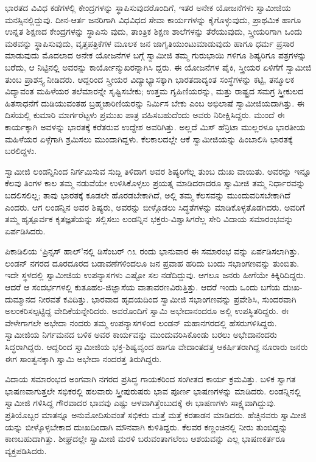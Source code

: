ಭಾರತದ ವಿವಿಧ ಕಡೆಗಳಲ್ಲಿ ಕೇಂದ್ರಗಳನ್ನು ಸ್ಥಾಪಿಸುವುದರೊಂದಿಗೆ, ಇತರ ಅನೇಕ ಯೋಜನೆಗಳು ಸ್ವಾಮೀಜಿಯ ಮನಸ್ಸಿನಲ್ಲಿದ್ದುವು. ದೀನ-ಆರ್ತ ಜನರಿಗಾಗಿ ವಿಧವಿಧದ ಸೇವಾ ಕಾರ್ಯಗಳನ್ನು ಕೈಗೊಳ್ಳುವುದು, ಪ್ರಾಥಮಿಕ ಹಾಗೂ ಉನ್ನತ ಶಿಕ್ಷಣದ ಕೇಂದ್ರಗಳನ್ನು ಸ್ಥಾಪಿಸು ವುದು, ತಾಂತ್ರಿಕ ಶಿಕ್ಷಣ ಶಾಲೆಗಳನ್ನು ತೆರೆಯುವುದು, ಸ್ತ್ರೀಯರಿಗಾಗಿ ಒಂದು ಮಠವನ್ನು ಸ್ಥಾಪಿಸುವುದು, ವೃತ್ತಪತ್ರಿಕೆಗಳ ಮೂಲಕ ಜನ ಜಾಗೃತಿಯುಂಟುಮಾಡುವುದು ಹಾಗೂ ಧರ್ಮ ಪ್ರಸಾರ ಮಾಡುವುದು ಮೊದಲಾದ ಅನೇಕ ಯೋಜನೆಗಳ ಬಗ್ಗೆ ಸ್ವಾಮೀಜಿ ತಮ್ಮ ಗುರುಭಾಯಿ ಗಳಿಗೂ ಶಿಷ್ಯರಿಗೂ ಪತ್ರಗಳನ್ನು ಬರೆದು, ಆ ನಿಟ್ಟಿನಲ್ಲಿ ಅವರನ್ನು ಕಾರ್ಯೋನ್ಮುಖರನ್ನಾಗಿಸಿ ದ್ದರು. ಈ ಯೋಜನೆಗಳ ಪೈಕಿ, ಸ್ತ್ರೀಯರ ಏಳಿಗೆಗೆ ಸ್ವಾಮೀಜಿ ತುಂಬ ಪ್ರಾಶಸ್ತ್ಯ ನೀಡಿದರು. ಆದ್ದರಿಂದ ಸ್ತ್ರೀಯರ ವಿದ್ಯಾಭ್ಯಾಸಕ್ಕಾಗಿ ಭಾರತದಾದ್ಯಂತ ಸಂಸ್ಥೆಗಳನ್ನು ಕಟ್ಟಿ, ತನ್ಮೂಲಕ ವಿದ್ಯಾವಂತ ಮಹಿಳೆಯರ ತಲೆಮಾರನ್ನೇ ಸೃಷ್ಟಿಸಬೇಕು; ಉತ್ತಮ ಗೃಹಿಣಿಯರನ್ನು, ಮತ್ತು ರಾಷ್ಟ್ರದ ಸಮಗ್ರ ಸ್ತ್ರೀಕುಲದ ಹಿತಸಾಧನೆಗೆ ದುಡಿಯುವಂತಹ ಬ್ರಹ್ಮಚಾರಿಣಿಯರನ್ನು ನಿರ್ಮಿಸ ಬೇಕು ಎಂಬ ಅಭಿಲಾಷೆ ಸ್ವಾಮೀಜಿಯದಾಗಿತ್ತು. ಈ ದಿಸೆಯಲ್ಲಿ ಕುಮಾರಿ ಮಾರ್ಗರೆಟ್ಟಳು ಪ್ರಮುಖ ಪಾತ್ರ ವಹಿಸಬಹುದೆಂದು ಅವರು ನಿರೀಕ್ಷಿಸಿದ್ದರು. ಮುಂದೆ ಈ ಕಾರ್ಯಕ್ಕಾಗಿ ಅವಳನ್ನು ಭಾರತಕ್ಕೆ ಕರೆತರುವ ಉದ್ದೇಶ ಅವರಿಗಿತ್ತು. ಅಲ್ಲದೆ ಮಿಸ್ ಹೆನ್ರಿಟಾ ಮುಲ್ಲರಳೂ ಭಾರತೀಯ ಮಹಿಳೆಯರ ಏಳ್ಗೆಗಾಗಿ ಶ್ರಮಿಸಲು ಮುಂದಾಗಿದ್ದಳು. ಕೆಲಕಾಲದಲ್ಲೇ ಆಕೆ ಸ್ವಾಮೀಜಿಯನ್ನು ಹಿಂಬಾಲಿಸಿ ಭಾರತಕ್ಕೆ ಬರಲಿದ್ದಳು.

ಸ್ವಾಮೀಜಿ ಲಂಡನ್ನಿನಿಂದ ನಿರ್ಗಮಿಸುವ ಸುದ್ದಿ ತಿಳಿದಾಗ ಅವರ ಶಿಷ್ಯರಿಗೆಲ್ಲ ತುಂಬ ದುಃಖ ವಾಯಿತು. ಅವರನ್ನು ಇನ್ನೂ ಕೆಲವು ತಿಂಗಳ ಕಾಲ ತಮ್ಮ ನಡುವೆಯೇ ಉಳಿಸಿಕೊಳ್ಳಲು ಪ್ರಯತ್ನ ಮಾಡಿದರಾದರೂ ಸ್ವಾಮೀಜಿ ತಮ್ಮ ನಿರ್ಧಾರವನ್ನು ಬದಲಿಸಲಿಲ್ಲ; ತಾವು ಭಾರತಕ್ಕೆ ಕೂಡಲೇ ಹೊರಡಬೇಕಾಗಿದೆ, ಅಲ್ಲಿ ತಮ್ಮ ಕೆಲಸವನ್ನು ಮುಂದುವರಿಸಬೇಕಾಗಿದೆ ಎಂದರು. ಆಗ ಲಂಡನ್ನಿನ ಅವರ ಶಿಷ್ಯರು, ಅವರನ್ನು ಬೀಳ್ಗೊಡಲು ಸಿದ್ಧತೆಗಳನ್ನು ಮಾಡಿಕೊಳ್ಳತೊಡಗಿದರು. ಅವರಿಗೆ ತಮ್ಮ ಹೃತ್ಪೂರ್ವಕ ಕೃತಜ್ಞತೆಯನ್ನು ಸಲ್ಲಿಸಲು ಲಂಡನ್ನಿನ ಭಕ್ತರು-ವಿಶ್ವಾಸಿಗರೆಲ್ಲ ಸೇರಿ ವಿದಾಯ ಸಮಾರಂಭವನ್ನು ಏರ್ಪಡಿಸಿದರು.

ಪಿಕಾಡಿಲಿಯ ‘ಪ್ರಿನ್ಸಸ್ ಹಾಲ್​’ನಲ್ಲಿ ಡಿಸೆಂಬರ್ ೧೩ ರಂದು ಭಾನುವಾರ ಈ ಸಮಾರಂಭ ವನ್ನು ಏರ್ಪಡಿಸಲಾಗಿತ್ತು. ಲಂಡನ್ ನಗರದ ದೂರದೂರದ ಬಡಾವಣೆಗಳಿಂದಲೂ ಜನ ಪ್ರವಾಹ ಹರಿದು ಬಂದು ಸಭಾಂಗಣವನ್ನು ತುಂಬಿತು. ಇದೇ ಸ್ಥಳದಲ್ಲಿ ಸ್ವಾಮೀಜಿಯ ಉಪನ್ಯಾಸಗಳು ಎಷ್ಟೋ ಸಲ ನಡೆದಿದ್ದುವು. ಆಗಲೂ ಜನರು ಹೀಗೆಯೇ ಕಿಕ್ಕಿರಿದಿದ್ದರು. ಆದರೆ ಆ ಸಂದರ್ಭಗಳಲ್ಲಿ ಕುತೂಹಲ-ಜಿಜ್ಞಾಸೆಯ ವಾತಾವರಣವಿರುತ್ತಿತ್ತು. ಆದರೆ ಇಂದು ಒಂದು ಬಗೆಯ ದುಃಖ-ದುಮ್ಮಾನದ ನೀರವತೆ ಕವಿದಿತ್ತು. ಭಾರವಾದ ಹೃದಯದಿಂದ ಸ್ವಾಮೀಜಿ ಸಭಾಂಗಣವನ್ನು ಪ್ರವೇಶಿಸಿ, ಸುಂದರವಾಗಿ ಅಲಂಕರಿಸಲ್ಪಟ್ಟಿದ್ದ ವೇದಿಕೆಯನ್ನೇರಿದರು. ಅವರೊಂದಿಗೆ ಸ್ವಾಮಿ ಅಭೇದಾನಂದರೂ ಅಲ್ಲಿ ಉಪಸ್ಥಿತರಿದ್ದರು. ಈ ವೇಳೇಗಾಗಲೇ ಅಭೇದಾ ನಂದರು ತಮ್ಮ ಉಪನ್ಯಾಸಗಳಿಂದ ಲಂಡನ್ ಮಹಾನಗರದಲ್ಲಿ ಹೆಸರುಗಳಿಸಿದ್ದರು. ಸ್ವಾಮೀಜಿಯ ನಿರ್ಗಮನದ ಬಳಿಕ ಅವರ ಕಾರ್ಯವನ್ನು ಮುಂದುವರಿಸಿಕೊಂಡು ಬರಲು ಅಭೇದಾನಂದರು ಸಿದ್ಧರಾಗಿದ್ದರು. ಆದ್ದರಿಂದ ಸ್ವಾಮೀಜಿಯ ಭಕ್ತ-ಶಿಷ್ಯವೃಂದ ಹಾಗೂ ವೇದಾಂತದತ್ತ ಆಕರ್ಷಿತರಾಗಿದ್ದ ನೂರಾರು ಜನರು ಈಗ ಸಾಂತ್ವನಕ್ಕಾಗಿ ಸ್ವಾಮಿ ಅಭೇದಾ ನಂದರತ್ತ ತಿರುಗಿದ್ದರು.

ವಿದಾಯ ಸಮಾರಂಭದ ಅಂಗವಾಗಿ ನಗರದ ಪ್ರಸಿದ್ಧ ಗಾಯಕರಿಂದ ಸಂಗೀತದ ಕಾರ್ಯ ಕ್ರಮವಿತ್ತು. ಬಳಿಕ ಸ್ವಾಗತ ಭಾಷಣವಾಗುತ್ತಲೇ ಸಭಿಕರಲ್ಲಿ ಹಲವಾರು ಸ್ತ್ರೀಪುರುಷರು ಭಾವ ಪೂರ್ಣ ಭಾಷಣಗಳನ್ನು ಮಾಡಿದರು. ಲಂಡನ್ನಿನಲ್ಲಿ ಸ್ವಾಮೀಜಿ ಗಳಿಸಿದ್ದ ಗೌರವಾದರ ಭಾವವು ಎಷ್ಟು ಆಳವಾಗಿತ್ತೆಂಬುದಕ್ಕೆ ಈ ಭಾಷಣಗಳು ಸಾಕ್ಷ್ಯವಾಗಿದ್ದುವು. ಪ್ರತಿಯೊಬ್ಬರ ಮಾತನ್ನೂ ಅನುಮೋದಿಸುವಂತೆ ಸಭಿಕರು ಮತ್ತೆ ಮತ್ತೆ ಕರತಾಡನ ಮಾಡಿದರು. ಹೆಚ್ಚಿನವರು ಸ್ವಾಮೀಜಿ ಯನ್ನು ಬೀಳ್ಕೊಳ್ಳಬೇಕಾದ ದುಃಖದಿಂದಾಗಿ ಮೌನವಾಗಿ ಕುಳಿತಿದ್ದರು. ಕೆಲವರ ಕಣ್ಣಂಚಿನಲ್ಲಿ ನೀರು ತುಂಬಿದ್ದನ್ನು ಕಾಣಬಹುದಾಗಿತ್ತು. ಶೀಘ್ರದಲ್ಲೇ ಸ್ವಾಮೀಜಿ ಮರಳಿ ಬರುವಂತಾಗಲೆಂಬ ಆಶಯವನ್ನು ಎಲ್ಲ ಭಾಷಣಕರ್ತರೂ ವ್ಯಕ್ತಪಡಿಸಿದರು.

